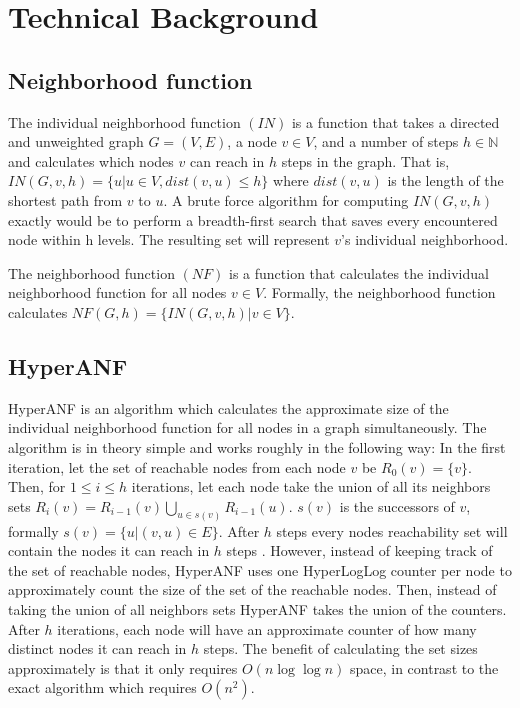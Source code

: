 \chapter{Technical Background}

\section{Neighborhood function}
The individual neighborhood function $(IN)$ is a function that takes a directed and unweighted graph $G = (V,E)$, a node $v \in V$, and a number of steps $h \in \mathbb{N}$ and calculates which nodes $v$ can reach in $h$ steps in the graph. That is, $IN(G,v,h) = \{u | u \in V, dist(v,u) \leq h\}$ where $dist(v,u)$ is the length of the shortest path from $v$ to $u$. A brute force algorithm for computing $IN(G,v,h)$ exactly would be to perform a breadth-first search that saves every encountered node within h levels. The resulting set will represent $v$'s individual neighborhood.

The neighborhood function $(NF)$ is a function that calculates the individual neighborhood function for all nodes $v \in V$. Formally, the neighborhood function calculates $NF(G,h) = \{ IN(G,v,h) | v \in V \}$.

\section{HyperANF}
HyperANF is an algorithm which calculates the approximate size of the individual neighborhood function for all nodes in a graph simultaneously. The algorithm is in theory simple and works roughly in the following way: In the first iteration, let the set of reachable nodes from each node $v$ be $R_0(v) = \{v\}$. Then, for $1 \leq i \leq h$ iterations, let each node take the union of all its neighbors sets $R_i(v) = R_{i-1}(v) \bigcup\limits_{u \in s(v)} R_{i-1}(u) $. $s(v)$ is the successors of $v$, formally $s(v) = \{u | (v,u) \in E\}$. After $h$ steps every nodes reachability set will contain the nodes it can reach in $h$ steps \cite{hyperball}. However, instead of keeping track of the set of reachable nodes, HyperANF uses one HyperLogLog counter per node to approximately count the size of the set of the reachable nodes. Then, instead of taking the union of all neighbors sets HyperANF takes the union of the counters. After $h$ iterations, each node will have an approximate counter of how many distinct nodes it can reach in $h$ steps. The benefit of calculating the set sizes approximately is that it only requires $O(n\log\log n)$ space, in contrast to the exact algorithm which requires $O(n^2)$.

